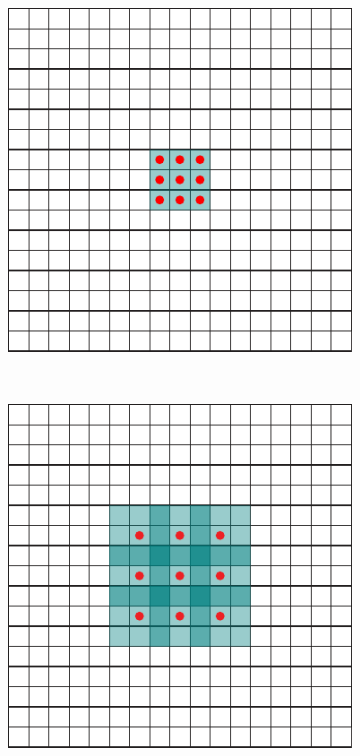 \documentclass{article} %
\begin{document}
\begin{figure}[t]
  \begin{center}
    \begin{subfigure}[b]{0.3\linewidth}
        \includegraphics[width=\textwidth]{figs/exp_dilation_1.pdf}
        \caption{}
    \end{subfigure}
    ~~
    \begin{subfigure}[b]{0.3\linewidth}
        \includegraphics[width=\textwidth]{figs/exp_dilation_2.pdf}

\end{subfigure}
\end{center}
\end{figure}
\end{document}
